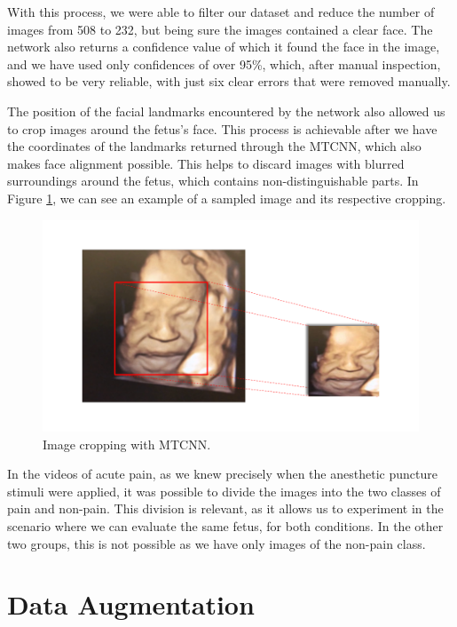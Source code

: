 With this process, we were able to filter our dataset and reduce the number of images from 508 to 232, but being sure the images contained a clear face. The network also returns a confidence value of which it found the face in the image, and we have used only confidences of over 95\%, which, after manual inspection, showed to be very reliable, with just six clear errors that were removed manually.

The position of the facial landmarks encountered by the network also allowed us to crop images around the fetus's face. This process is achievable after we have the coordinates of the landmarks returned through the MTCNN, which also makes face alignment possible. This helps to discard images with blurred surroundings around the fetus, which contains non-distinguishable parts. In Figure \ref{fig:cropping}, we can see an example of a sampled image and its respective cropping.

\begin{figure}[h!tp]
    \centering
    \includegraphics[width=.95\textwidth]{imgs/chap5_cropping.png}
    \caption{Image cropping with MTCNN.}
    \label{fig:cropping}
\end{figure}

In the videos of acute pain, as we knew precisely when the anesthetic puncture stimuli were applied, it was possible to divide the images into the two classes of pain and non-pain. This division is relevant, as it allows us to experiment in the scenario where we can evaluate the same fetus, for both conditions. In the other two groups, this is not possible as we have only images of the non-pain class.

\section{Data Augmentation}

